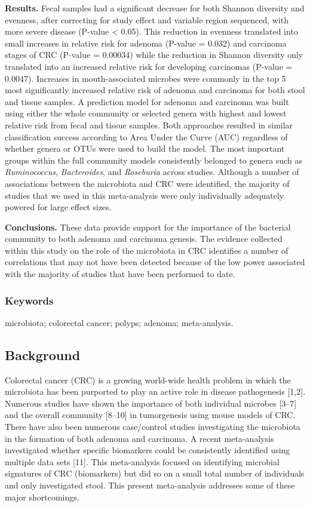 \documentclass[12pt,]{article}
\begin{document}
\textbf{Results.} Fecal samples had a significant decrease for both
Shannon diversity and evenness, after correcting for study effect and
variable region sequenced, with more severe disease (P-value \textless{}
0.05). This reduction in evenness translated into small increases in
relative risk for adenoma (P-value = 0.032) and carcinoma stages of CRC
(P-value = 0.00034) while the reduction in Shannon diversity only
translated into an increased relative risk for developing carcinomas
(P-value = 0.0047). Increases in mouth-associated microbes were commonly
in the top 5 most significantly increased relative risk of adenoma and
carcinoma for both stool and tissue samples. A prediction model for
adenoma and carcinoma was built using either the whole community or
selected genera with highest and lowest relative risk from fecal and
tissue samples. Both approaches resulted in similar classification
success according to Area Under the Curve (AUC) regardless of whether
genera or OTUs were used to build the model. The most important groups
within the full community models consistently belonged to genera such as
\emph{Ruminococcus}, \emph{Bacteroides}, and \emph{Roseburia} across
studies. Although a number of associations between the microbiota and
CRC were identified, the majority of studies that we used in this
meta-analysis were only individually adequately powered for large effect
sizes.

\textbf{Conclusions.} These data provide support for the importance of
the bacterial community to both adenoma and carcinoma genesis. The
evidence collected within this study on the role of the microbiota in
CRC identifies a number of correlations that may not have been detected
because of the low power associated with the majority of studies that
have been performed to date.

\subsubsection{Keywords}\label{keywords}

microbiota; colorectal cancer; polyps; adenoma; meta-analysis.

\newpage

\subsection{Background}\label{background}

Colorectal cancer (CRC) is a growing world-wide health problem in which
the microbiota has been purported to play an active role in disease
pathogenesis {[}1,2{]}. Numerous studies have shown the importance of
both individual microbes {[}3--7{]} and the overall community
{[}8--10{]} in tumorgenesis using mouse models of CRC. There have also
been numerous case/control studies investigating the microbiota in the
formation of both adenoma and carcinoma. A recent meta-analysis
investigated whether specific biomarkers could be consistently
identified using multiple data sets {[}11{]}. This meta-analysis focused
on identifying microbial signatures of CRC (biomarkers) but did so on a
small total number of individuals and only investigated stool. This
present meta-analysis addresses some of these major shortcomings.
\end{document}
